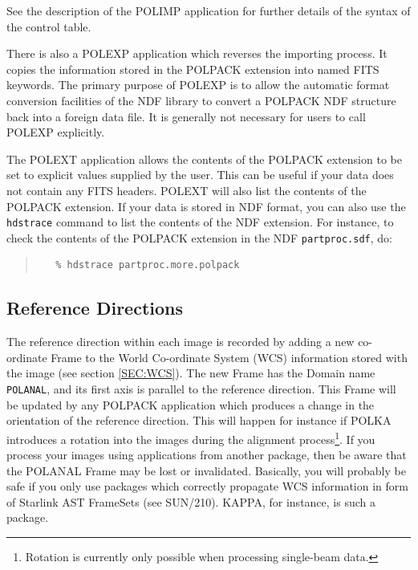\documentclass[twoside,11pt]{article}
\newcommand{\hyperref}[4]{#2\ref{#4}#3}
\newcommand{\htmlref}[2]{#1}
\newcommand{\xref}[3]{#1}
\renewcommand{\_}{\texttt{\symbol{95}}}
\newenvironment{myquote}{\begin{quote}\begin{small}}{\end{small}\end{quote}}
\begin{document}
See the description of the \htmlref{POLIMP}{POLIMP} application for
further details of the syntax of the control table.

There is also a \htmlref{POLEXP}{POLEXP} application which reverses the 
importing process. It copies the information stored in the POLPACK
extension into named FITS keywords. The primary purpose of POLEXP is 
to allow the automatic format conversion facilities of the NDF library to
convert a POLPACK NDF structure back into a foreign data file.
It is generally not necessary for users to call POLEXP explicitly. 

The \htmlref{POLEXT}{POLEXT} application allows the contents of the
POLPACK extension to be set to explicit values supplied by the user. This
can be useful if your data does not contain any FITS headers. POLEXT will
also list the contents of the POLPACK extension. If your data is stored
in NDF format, you can also use the \xref{\texttt{hdstrace}}{sun102}{}
command to list the contents of the NDF extension. For instance, to check
the contents of the POLPACK extension in the NDF \verb+partproc.sdf+, do:

\begin{myquote}
\begin{verbatim}
   % hdstrace partproc.more.polpack
\end{verbatim}
\end{myquote}

\subsection{Reference Directions}
The reference direction within each image is recorded by adding a new
co-ordinate Frame to the World Co-ordinate System (WCS) information
stored with the image (see \hyperref{here}{section }{}{SEC:WCS}). The new 
Frame has the Domain name \verb+POLANAL+,
and its first axis is parallel to the reference direction. This Frame
will be updated by any POLPACK application which produces a change in the
orientation of the reference direction. This will happen
for instance if \htmlref{POLKA}{POLKA} introduces a rotation into the
images during the alignment process\footnote{Rotation is currently only
possible when processing single-beam data.}. If you process your images
using applications from another package, then be aware that the POLANAL Frame
may be lost or invalidated. Basically,
you will probably be safe if you only use packages which correctly
propagate WCS information in form of Starlink AST FrameSets (see
\xref{SUN/210}{sun210}{}). KAPPA, for instance, is such a package.
\end{document}
